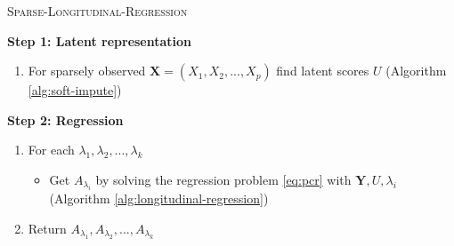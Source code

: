 \documentclass[preprint]{imsart}
\numberwithin{equation}{section}
\theoremstyle{plain}
\newcommand{\bX}{\mathbf{X}}
\newcommand{\tr}[1]{{\textcolor{red}{#1}}}
\begin{document}
\begin{algorithm}
\caption{\textsc{Sparse-Longitudinal-Regression}\label{alg:sparse-regression}}
\vspace{3pt}
\begin{flushleft}
\textbf{Step 1: Latent representation}
\end{flushleft}
\begin{enumerate}
\item For sparsely observed $\bX = (X_1,X_2,...,X_p)$ find latent scores $U$ (Algorithm \ref{alg:soft-impute})
\end{enumerate}
\begin{flushleft}
\textbf{Step 2: Regression}
\end{flushleft}
\begin{enumerate}
\item For each $\lambda_1,\lambda_2,...,\lambda_k$
  \begin{itemize}
  \item Get $A_{\lambda_i}$ by solving the regression problem \eqref{eq:pcr} with $\textbf{Y},U,\lambda_i$ (Algorithm \ref{alg:longitudinal-regression})
  \end{itemize}
\item Return $A_{\lambda_1}, A_{\lambda_2}, ..., A_{\lambda_k}$
\end{enumerate}
\end{algorithm}
\end{document}
